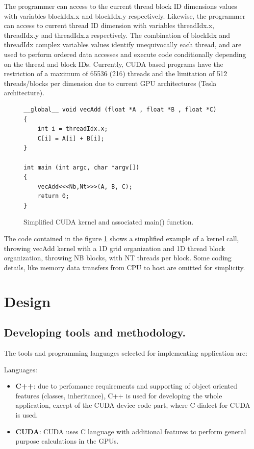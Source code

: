 \documentclass[thesis=M,english]{FITthesis}[2011/07/15]
\begin{document}
The programmer can access to the current thread block ID dimensions values with variables blockIdx.x and blockIdx.y respectively. Likewise, the programmer can access to current thread ID dimension with variables threadIdx.x, threadIdx.y and threadIdx.z respectively. The combination of blockIdx and threadIdx complex variables values identify unequivocally each thread, and are used to perform ordered data accesses and execute code conditionally depending on the thread and block IDs. Currently, CUDA based programs have the restriction of a maximum of 65536 (216) threads and the limitation of 512 threads/blocks per dimension due to current GPU architectures (Tesla architecture).

\begin{figure}[h]
\begin{lstlisting}
__global__ void vecAdd (float *A , float *B , float *C)
{
	int i = threadIdx.x;
	C[i] = A[i] + B[i];
}

int main (int argc, char *argv[])
{
	vecAdd<<<Nb,Nt>>>(A, B, C);
	return 0;
}

\end{lstlisting}
\caption{Simplified CUDA kernel and associated main() function.}
\label{fig:cuda_kernel}
\end{figure}

The code contained in the figure \ref{fig:cuda_kernel} shows a simplified example of a kernel call, throwing vecAdd kernel with a 1D grid organization and 1D thread block organization, throwing NB blocks, with NT threads per block. Some coding details, like memory data transfers from CPU to host are omitted for simplicity.

\chapter{Design}
\label{chap:design}

\section{Developing tools and methodology.}
The tools and programming languages selected for implementing application are:

Languages:

\begin{itemize}
\item \textbf{C++}: due to perfomance requirements and supporting of object oriented features (classes, inheritance), C++ is used for developing the whole application, except of the CUDA device code part, where C dialect for CUDA is used.
\item \textbf{CUDA}: CUDA uses C language with additional features to perform general purpose calculations in the GPUs.
\end{itemize}
\end{document}
